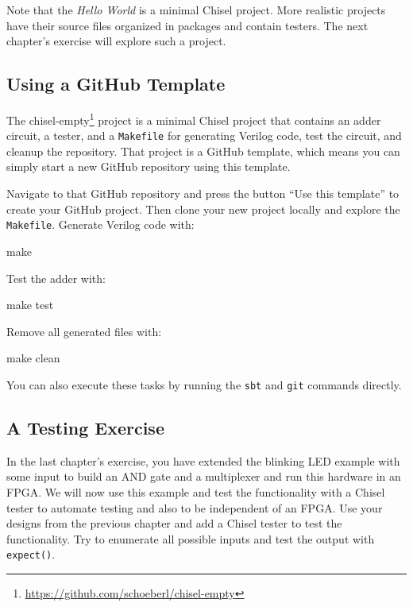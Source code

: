 \documentclass[%
    10pt,
    headinclude, footexclude,
    openright, %
    notitlepage,
    cleardoubleempty,
    headsepline,
    pointlessnumbers,
    bibtotoc, idxtotoc,
    ]{scrbook}
\newcommand{\code}[1]{{\small{\texttt{#1}}}}
\newcommand{\myref}[2]{\href{#1}{#2}}
\renewcommand{\myref}[2]{{#2}{\footnote{\url{#1}}}}
\begin{document}
Note that the \emph{Hello World} is a minimal Chisel project.
More realistic projects have their source files organized in packages and contain testers.
The next chapter's exercise will explore such a project.

\subsection{Using a GitHub Template}

The \myref{https://github.com/schoeberl/chisel-empty}{chisel-empty} project is a minimal Chisel
project that contains an adder circuit, a tester, and a \code{Makefile} for generating
Verilog code, test the circuit, and cleanup the repository.
That project is a GitHub template, which means you can simply start a new GitHub repository
using this template.

Navigate to that GitHub repository and press the button ``Use this template'' to create
your GitHub project. Then clone your new project locally and explore the \code{Makefile}.
Generate Verilog code with:

\begin{chisel}
make
\end{chisel}

\noindent Test the adder with:

\begin{chisel}
make test
\end{chisel}

\noindent Remove all generated files with:

\begin{chisel}
make clean
\end{chisel}

\noindent You can also execute these tasks by running the \code{sbt} and \code{git} commands directly.

\subsection{A Testing Exercise}

In the last chapter's exercise, you have extended the blinking LED example with some input
to build an AND gate and a multiplexer and run this hardware in an FPGA.
We will now use this example and test the functionality with a Chisel tester
to automate testing and also to be independent of an FPGA.
Use your designs from the previous chapter and add a Chisel tester to test the functionality.
Try to enumerate all possible inputs and test the output with \code{expect()}.
\end{document}
